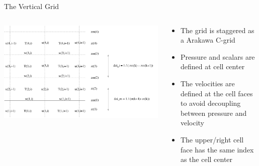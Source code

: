 \begin{frame}{The Vertical Grid}
\begin{columns}
\begin{column}{0.5\textwidth} 
\includegraphics[height=0.5\textheight]{grid2.pdf}
\end{column}
\begin{column}{0.45\textwidth}
 \begin{itemize}
  \item The grid is staggered as a Arakawa C-grid
  \item Pressure and scalars are defined at cell center
  \item The velocities are defined at the cell faces to avoid decoupling between pressure and velocity
  \item The upper/right cell face has the same index as the cell center
 \end{itemize}

\end{column}

\end{columns}
\end{frame}
